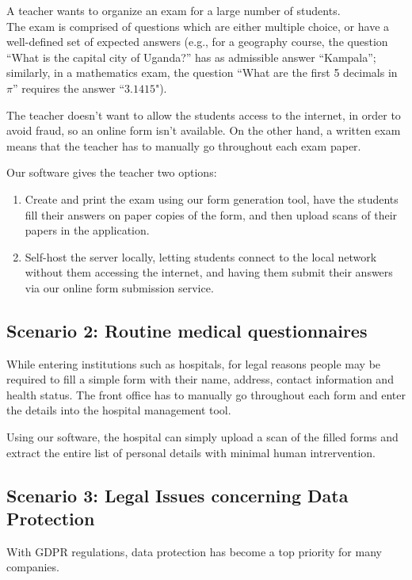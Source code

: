 \documentclass[11pt, a4paper]{report}
\begin{document}
A teacher wants to organize an exam for a large number of students.\\
The exam is comprised of questions which are either multiple choice, or have a well-defined set of expected answers (e.g., for a geography course, the question ``What is the capital city of Uganda?'' has as admissible answer ``Kampala''; similarly, in a mathematics exam, the question ``What are the first 5 decimals in $\pi$'' requires the answer ``$3.1415$").

The teacher doesn't want to allow the students access to the internet, in order to avoid fraud, so an online form isn't available. On the other hand, a written exam means that the teacher has to manually go throughout each exam paper.

Our software gives the teacher two options:
\begin{enumerate}
    \item Create and print the exam using our form generation tool, have the students fill their answers on paper copies of the form, and then upload scans of their papers in the application. 
    \item Self-host the server locally, letting students connect to the local network without them accessing the internet, and having them submit their answers via our online form submission service.
\end{enumerate}

\subsection*{Scenario 2: Routine medical questionnaires}

While entering institutions such as hospitals, for legal reasons people may be required to fill a simple form with their name, address, contact information and health status.
The front office has to manually go throughout each form and enter the details into the hospital management tool.

Using our software, the hospital can simply upload a scan of the filled forms and extract the entire list of personal details with minimal human intrervention.

\subsection*{Scenario 3:  Legal Issues concerning Data Protection}

With GDPR regulations, data protection has become a top priority for many companies.
\end{document}
